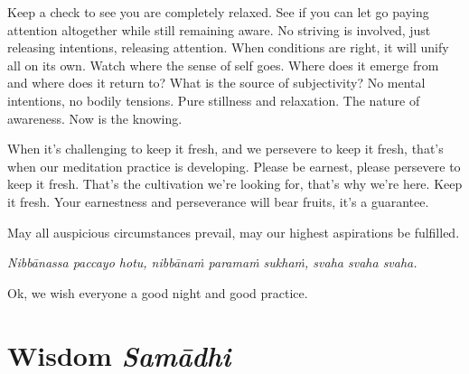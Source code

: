 \documentclass[12pt,openany]{book}
\begin{document}
Keep a check to see you are completely relaxed. See if you can let go paying attention altogether while still remaining aware. No striving is involved, just releasing intentions, releasing attention. When conditions are right, it will unify all on its own. Watch where the sense of self goes. Where does it emerge from and where does it return to? What is the source of subjectivity? No mental intentions, no bodily tensions. Pure stillness and relaxation. The nature of awareness. Now is the knowing. 

When it's challenging to keep it fresh, and we persevere to keep it fresh, that's when our meditation practice is developing. Please be earnest, please persevere to keep it fresh. That's the cultivation we're looking for, that's why we're here. Keep it fresh. Your earnestness and perseverance will bear fruits, it's a guarantee. 

May all auspicious circumstances prevail, may our highest aspirations be fulfilled. 

\textit{Nibbānassa paccayo hotu, nibbānaṁ paramaṁ sukhaṁ, svaha svaha svaha.}

Ok, we wish everyone a good night and good practice.

\medskip

\begin{figure}[h]
    \centering
\end{figure}

\chapter*{Wisdom \textit{Samādhi}}
\end{document}
